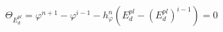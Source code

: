 \begin{equation}\label{eq:Phi}
\varTheta_{E_d^{pl}} = \varphi^{n+1} - \varphi^{i-1} - h_{\varphi}^n (E_d^{pl}-(E_d^{pl})^{i-1})=0
\end{equation}


%
%

